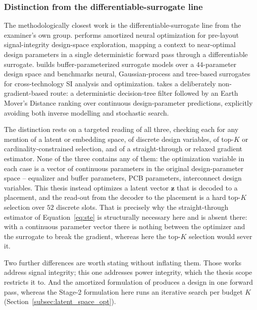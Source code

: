 \subsubsection*{Distinction from the differentiable-surrogate line}

The methodologically closest work is the differentiable-surrogate line from the
examiner's own group. \cite{withoft2026amortized} performs amortized neural
optimization for pre-layout signal-integrity design-space exploration, mapping a
context to near-optimal design parameters in a single deterministic forward pass
through a differentiable surrogate. \cite{withoft2026buffer} builds
buffer-parameterized surrogate models over a $44$-parameter design space and
benchmarks neural, Gaussian-process and tree-based surrogates for cross-technology
SI analysis and optimization. \cite{ecik2026emd} takes a deliberately
non-gradient-based route: a deterministic decision-tree filter followed by an
Earth Mover's Distance ranking over continuous design-parameter predictions,
explicitly avoiding both inverse modelling and stochastic search.

The distinction rests on a targeted reading of all three, checking each for any
mention of a latent or embedding space, of discrete design variables, of top-$K$
or cardinality-constrained selection, and of a straight-through or relaxed
gradient estimator. None of the three contains any of them: the optimization
variable in each case is a vector of continuous parameters in the original
design-parameter space -- equalizer and buffer parameters, PCB parameters,
interconnect design variables. This thesis instead optimizes a latent vector
$\mathbf{z}$ that is decoded to a placement, and the read-out from the decoder to
the placement is a hard top-$K$ selection over $52$ discrete slots. That is
precisely why the straight-through estimator of Equation~\ref{eq:ste} is
structurally necessary here and is absent there: with a continuous parameter
vector there is nothing between the optimizer and the surrogate to break the
gradient, whereas here the top-$K$ selection would sever it.

Two further differences are worth stating without inflating them. Those works
address signal integrity; this one addresses power integrity, which the thesis
scope restricts it to. And the amortized formulation of
\cite{withoft2026amortized} produces a design in one forward pass, whereas the
Stage-2 formulation here runs an iterative search per budget $K$
(Section~\ref{subsec:latent_space_opt}).

